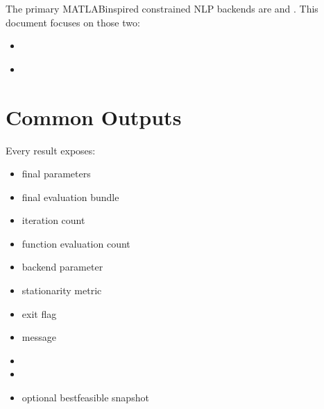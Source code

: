 \documentclass[letterpaper,10pt,english]{sphinxmanual}
\begin{document}
\sphinxAtStartPar
The primary MATLAB\sphinxhyphen{}inspired constrained NLP backends are  and .
This document focuses on those two:
\begin{itemize}
\item {} 
\sphinxAtStartPar
{\hyperref[\detokenize{optima_sequential_qp::doc}]{}}

\item {} 
\sphinxAtStartPar
{\hyperref[\detokenize{optima_internal_protocol::doc}]{}}

\end{itemize}


\section{Common Outputs}
\label{\detokenize{optima_algorithms:common-outputs}}
\sphinxAtStartPar
Every  result exposes:
\begin{itemize}
\item {} 
\sphinxAtStartPar
final parameters

\item {} 
\sphinxAtStartPar
final evaluation bundle

\item {} 
\sphinxAtStartPar
iteration count

\item {} 
\sphinxAtStartPar
function evaluation count

\item {} 
\sphinxAtStartPar
backend parameter

\item {} 
\sphinxAtStartPar
stationarity metric

\item {} 
\sphinxAtStartPar
exit flag

\item {} 
\sphinxAtStartPar
message

\item {} 
\sphinxAtStartPar
{}

\item {} 
\sphinxAtStartPar
{}

\item {} 
\sphinxAtStartPar
optional best\sphinxhyphen{}feasible snapshot

\end{itemize}
\end{document}
